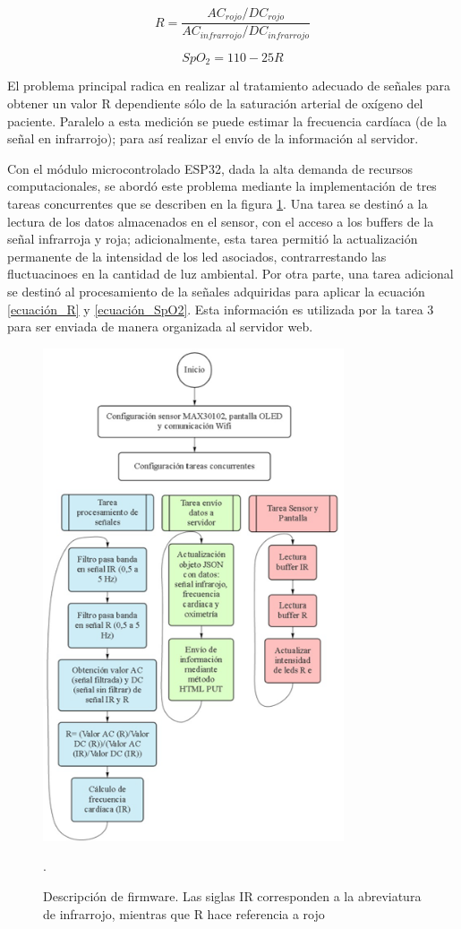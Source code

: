 \documentclass[journal]{IEEEtran}
\begin{document}
\begin{equation}
	R=\frac{AC_{rojo}/DC_{rojo}}{AC_{infrarrojo}/DC_{infrarrojo}}
	\label{ecuación_R}
\end{equation}

\begin{equation}
	SpO_2 = 110-25R
	\label{ecuación_SpO2}
\end{equation}


El problema principal radica en realizar al tratamiento adecuado de señales para obtener un valor R dependiente sólo de la saturación arterial de oxígeno del paciente. Paralelo a esta medición se puede estimar la frecuencia cardíaca (de la señal en infrarrojo); para así realizar el envío de la información al servidor. 

Con el módulo microcontrolado ESP32, dada la alta demanda de recursos computacionales, se abordó este problema mediante la implementación de tres tareas concurrentes que se describen en la figura \ref{Descripción_firmware}. Una tarea se destinó a la lectura de los datos almacenados en el sensor, con el acceso a los buffers de la señal infrarroja y roja; adicionalmente, esta tarea permitió la actualización permanente de la intensidad de los led asociados, contrarrestando las fluctuacinoes en la cantidad de luz ambiental. Por otra parte, una tarea adicional se destinó al procesamiento de la señales adquiridas para aplicar la ecuación \ref{ecuación_R} y \ref{ecuación_SpO2}. Esta información es utilizada por la tarea 3 para ser enviada de manera organizada al servidor web.


\begin{figure}[!h]
	\centering
	\includegraphics[width=3.5in]{diagrama_flujo.png}
	\caption{Descripción de firmware. Las siglas IR corresponden a la abreviatura de infrarrojo, mientras que R hace referencia a rojo}.
	\label{Descripción_firmware}
\end{figure}
\end{document}
